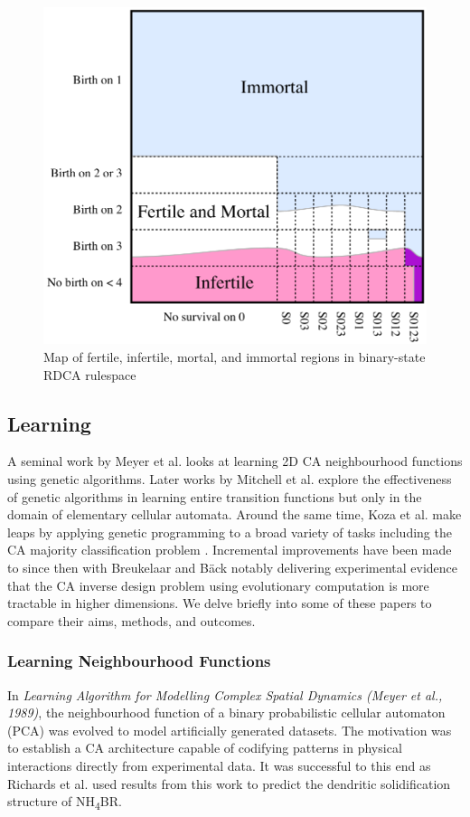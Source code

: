 \begin{figure}[!h]
\centering
    \includegraphics[width=.5\textwidth]{images/eppstein-map.png}
    \caption{Map of fertile, infertile, mortal, and immortal regions in binary-state RDCA rulespace \cite{eppstein2010growth}}
\label{fig:eppstein-map}
\end{figure}

\subsection{Learning}

A seminal work by Meyer et al.\cite{meyer1989learning} looks at learning 2D CA neighbourhood functions using genetic algorithms. Later works by Mitchell et al. \cite{mitchell1996evolving} explore the effectiveness of genetic algorithms in learning entire transition functions but only in the domain of elementary cellular automata. Around the same time, Koza et al. make leaps by applying genetic programming to a broad variety of tasks including the CA majority classification problem \cite{andre1996discovery}. Incremental improvements have been made to since then with Breukelaar and B{\"a}ck notably delivering experimental evidence that the CA inverse design problem using evolutionary computation is more tractable in higher dimensions\cite{breukelaar2005using}. We delve briefly into some of these papers to compare their aims, methods, and outcomes.

\subsubsection{Learning Neighbourhood Functions}

In \textit{Learning Algorithm for Modelling Complex Spatial Dynamics (Meyer et al., 1989)}\cite{meyer1989learning}, the neighbourhood function of a binary probabilistic cellular automaton (PCA) was evolved to model artificially generated datasets. The motivation was to establish a CA architecture capable of codifying patterns in physical interactions directly from experimental data. It was successful to this end as Richards et al.\cite{richards1990extracting} used results from this work to predict the dendritic solidification structure of NH\textsubscript{4}BR.

